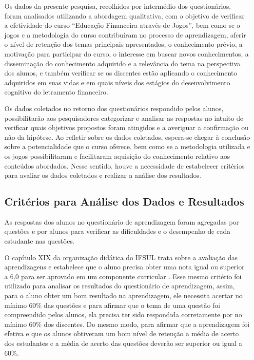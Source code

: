 Os dados da presente pesquisa, recolhidos por intermédio dos questionários, foram analisados utilizando a abordagem qualitativa, com o objetivo de verificar a efetividade do curso “Educação Financeira através de Jogos”, bem como se o jogos e a metodologia do curso contribuíram no processo de aprendizagem, aferir o nível de retenção dos temas principais apresentados, o conhecimento prévio, a motivação para participar do curso, o interesse em buscar novos conhecimentos, a disseminação do conhecimento adquirido e a relevância do tema na perspectiva dos alunos, e também verificar se os discentes estão aplicando o conhecimento adquiridos em suas vidas e em quais níveis dos estágios do desenvolvimento cognitivo do letramento financeiro.

Os dados coletados no retorno dos questionários respondido pelos alunos, possibilitarão aos pesquisadores categorizar e analisar as respostas no intuito de verificar quais objetivos propostos foram atingidos e a averiguar a confirmação ou não da hipótese. Ao refletir sobre os dados coletados, espera-se chegar à conclusão sobre a potencialidade que o curso oferece, bem como se a metodologia utilizada e os jogos possibilitaram e facilitaram aquisição do conhecimento relativo aos conteúdos abordados. Nesse sentido, houve a necessidade de estabelecer critérios para avaliar os dados coletados e realizar a análise dos resultados.

\subsection{Critérios para Análise dos Dados e Resultados}
As respostas dos alunos no questionário de aprendizagem foram agregadas por questões e por alunos para verificar as dificuldades e o desempenho de cada estudante nas questões.

O capítulo XIX da organização didática do IFSUL trata sobre a avaliação das aprendizagens e estabelece que o aluno precisa obter uma nota igual ou superior a 6,0 para ser aprovado em um componente curricular \cite{ifsul2012}. Esse mesmo critério foi utilizado para analisar os resultados do questionário de aprendizagem, assim, para o aluno obter um bom resultado na aprendizagem, ele necessita acertar no mínimo 60\% das questões e para afirmar que o tema de uma questão foi compreendido pelos alunos, ela precisa ter sido respondida corretamente por no mínimo 60\% dos discentes. Do mesmo modo, para afirmar que a aprendizagem foi efetiva e que os alunos obtiveram um bom nível de retenção a média de acerto dos estudantes e a média de acerto das questões deverão ser superior ou igual a 60\%.

